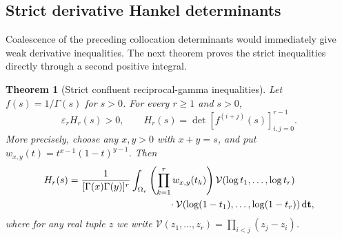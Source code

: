 \documentclass[11pt,a4paper]{article}
\newtheorem{theorem}{Theorem}[section]
\theoremstyle{definition}
\theoremstyle{remark}
\newcommand{\dd}{\,\mathrm d}
\newcommand{\ep}{\varepsilon}
\newcommand{\V}{\mathcal V}
\begin{document}
\subsection{Strict derivative Hankel determinants}

Coalescence of the preceding collocation determinants would immediately
give weak derivative inequalities. The next theorem proves the strict
inequalities directly through a second positive integral.

\begin{theorem}[Strict confluent reciprocal-gamma inequalities]
\label{cg:confluent}
Let \(f(s)=1/\Gamma(s)\) for \(s>0\). For every \(r\ge1\) and \(s>0\),
\begin{equation}\label{cg:confluent-inequality}
 \ep_r H_r(s)>0,
 \qquad
 H_r(s)=\det[f^{(i+j)}(s)]_{i,j=0}^{r-1}.
\end{equation}
More precisely, choose any \(x,y>0\) with \(x+y=s\), and put
\(w_{x,y}(t)=t^{x-1}(1-t)^{y-1}\). Then
\begin{equation}\label{cg:confluent-integral}
\begin{split}
 H_r(s)
 ={}&\frac{1}{[\Gamma(x)\Gamma(y)]^r}
 \int_{\Omega_r}
   \left(\prod_{k=1}^{r}w_{x,y}(t_k)\right)
   \V(\log t_1,\ldots,\log t_r)\\
 &\hspace{32mm}\cdot
   \V(\log(1-t_1),\ldots,\log(1-t_r))
   \dd\mathbf t ,
\end{split}
\end{equation}
where for any real tuple \(z\) we write
\(\V(z_1,\ldots,z_r)=\prod_{i<j}(z_j-z_i)\).
\end{theorem}
\end{document}
